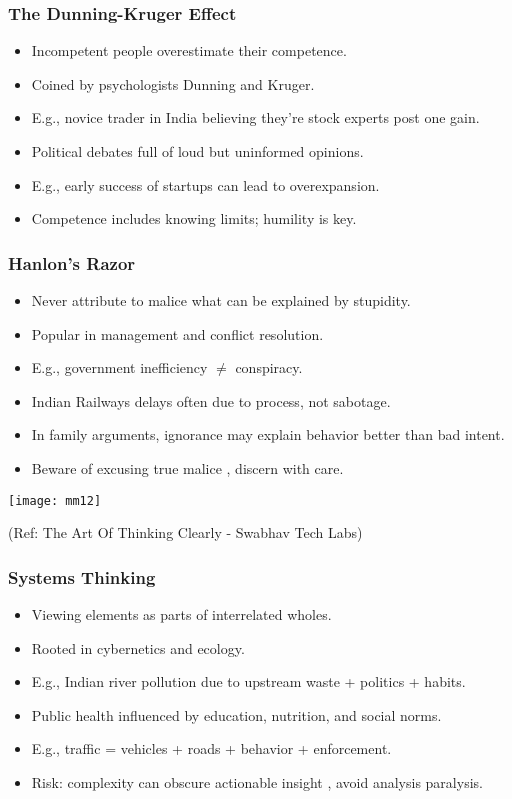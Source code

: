 \begin{frame}[fragile]\frametitle{The Dunning-Kruger Effect}
  \begin{itemize}
    \item Incompetent people overestimate their competence.
    \item Coined by psychologists Dunning and Kruger.
    \item E.g., novice trader in India believing they're stock experts post one gain.
    \item Political debates full of loud but uninformed opinions.
    \item E.g., early success of startups can lead to overexpansion.
    \item Competence includes knowing limits; humility is key.
  \end{itemize}
\end{frame}

\begin{frame}[fragile]\frametitle{Hanlon's Razor}
  \begin{itemize}
    \item Never attribute to malice what can be explained by stupidity.
    \item Popular in management and conflict resolution.
    \item E.g., government inefficiency $\neq$ conspiracy.
    \item Indian Railways delays often due to process, not sabotage.
    \item In family arguments, ignorance may explain behavior better than bad intent.
    \item Beware of excusing true malice , discern with care.
  \end{itemize}
  
	\begin{center}
	\texttt{[image: mm12]}
	\end{center}
	
{\tiny (Ref: The Art Of Thinking Clearly - Swabhav Tech Labs)}    
\end{frame}

\begin{frame}[fragile]\frametitle{Systems Thinking}
  \begin{itemize}
    \item Viewing elements as parts of interrelated wholes.
    \item Rooted in cybernetics and ecology.
    \item E.g., Indian river pollution due to upstream waste + politics + habits.
    \item Public health influenced by education, nutrition, and social norms.
    \item E.g., traffic = vehicles + roads + behavior + enforcement.
    \item Risk: complexity can obscure actionable insight , avoid analysis paralysis.
  \end{itemize}
\end{frame}

